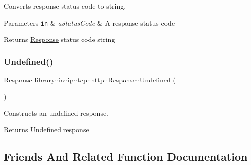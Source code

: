 Converts response status code to string. 


\begin{DoxyParams}[1]{Parameters}
\mbox{\tt in}  & {\em a\+Status\+Code} & A response status code \\
\hline
\end{DoxyParams}
\begin{DoxyReturn}{Returns}
\hyperlink{classlibrary_1_1io_1_1ip_1_1tcp_1_1http_1_1_response}{Response} status code string 
\end{DoxyReturn}
\mbox{\label{classlibrary_1_1io_1_1ip_1_1tcp_1_1http_1_1_response_a94f21d4e9187e055d8b3b21a96669626}} 
\subsubsection{\texorpdfstring{Undefined()}{Undefined()}}
{\footnotesize\ttfamily \hyperlink{classlibrary_1_1io_1_1ip_1_1tcp_1_1http_1_1_response}{Response} library\+::io\+::ip\+::tcp\+::http\+::\+Response\+::\+Undefined (\begin{DoxyParamCaption}{ }\end{DoxyParamCaption})\hspace{0.3cm}{\ttfamily [static]}}



Constructs an undefined response. 

\begin{DoxyReturn}{Returns}
Undefined response 
\end{DoxyReturn}


\subsection{Friends And Related Function Documentation}
\mbox{\label{classlibrary_1_1io_1_1ip_1_1tcp_1_1http_1_1_response_ae3715558aef62c5b9c3c9971e307dd8e}} 
